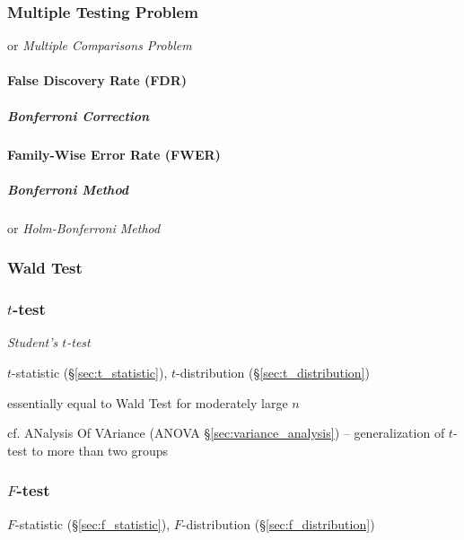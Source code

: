 \subsubsection{Multiple Testing Problem}\label{sec:multiple_testing}

or \emph{Multiple Comparisons Problem}




\paragraph{False Discovery Rate (FDR)}\label{sec:fdr}\hfill

\subparagraph{Bonferroni Correction}\label{sec:bonferroni_correction}\hfill



\paragraph{Family-Wise Error Rate (FWER)}\label{sec:fwer}\hfill

\subparagraph{Bonferroni Method}\label{sec:bonferroni_method}\hfill

or \emph{Holm-Bonferroni Method}



\subsubsection{Wald Test}\label{sec:wald_test}

\subsubsection{$t$-test}\label{sec:t_test}

\emph{Student's $t$-test}

\fist $t$-statistic (\S\ref{sec:t_statistic}),
$t$-distribution (\S\ref{sec:t_distribution})

essentially equal to Wald Test for moderately large $n$

\fist cf. ANalysis Of VAriance (ANOVA \S\ref{sec:variance_analysis}) --
generalization of $t$-test to more than two groups



\subsubsection{$F$-test}\label{sec:f_test}

\fist $F$-statistic (\S\ref{sec:f_statistic}),
$F$-distribution (\S\ref{sec:f_distribution})

